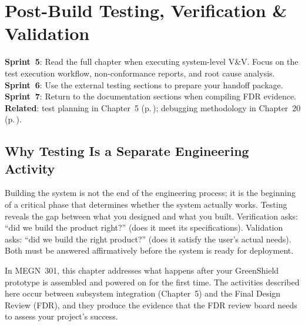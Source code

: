 \chapter{Post-Build Testing, Verification \& Validation}\label{ch:postbuild}

\begin{tipbox}
\textbf{Sprint~5}: Read the full chapter when executing system-level V\&V. Focus on the test execution workflow, non-conformance reports, and root cause analysis. \textbf{Sprint~6}: Use the external testing sections to prepare your handoff package. \textbf{Sprint~7}: Return to the documentation sections when compiling FDR evidence. \textbf{Related}: test planning in Chapter~5 (p.\,\pageref{ch:vv}); debugging methodology in Chapter~20 (p.\,\pageref{ch:debug}).
\end{tipbox}

\section{Why Testing Is a Separate Engineering Activity}
Building the system is not the end of the engineering process; it is the beginning of a critical phase that determines whether the system actually works. Testing reveals the gap between what you designed and what you built. Verification asks: ``did we build the product right?'' (does it meet its specifications). Validation asks: ``did we build the right product?'' (does it satisfy the user's actual needs). Both must be answered affirmatively before the system is ready for deployment.

In MEGN~301, this chapter addresses what happens after your GreenShield prototype is assembled and powered on for the first time. The activities described here occur between subsystem integration (Chapter~5) and the Final Design Review (FDR), and they produce the evidence that the FDR review board needs to assess your project's success.

